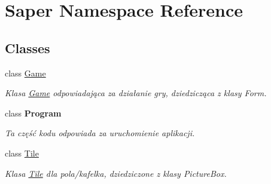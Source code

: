\hypertarget{namespace_saper}{}\section{Saper Namespace Reference}
\label{namespace_saper}
\subsection*{Classes}
\begin{DoxyCompactItemize}
\item 
class \mbox{\hyperlink{class_saper_1_1_game}{Game}}
\begin{DoxyCompactList}\small\item\em Klasa \mbox{\hyperlink{class_saper_1_1_game}{Game}} odpowiadająca za działanie gry, dziedzicząca z klasy Form. \end{DoxyCompactList}\item 
class {\bfseries Program}
\begin{DoxyCompactList}\small\item\em Ta część kodu odpowiada za uruchomienie aplikacji. \end{DoxyCompactList}\item 
class \mbox{\hyperlink{class_saper_1_1_tile}{Tile}}
\begin{DoxyCompactList}\small\item\em Klasa \mbox{\hyperlink{class_saper_1_1_tile}{Tile}} dla pola/kafelka, dziedziczone z klasy Picture\+Box. \end{DoxyCompactList}\end{DoxyCompactItemize}
